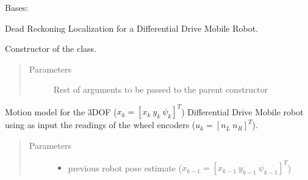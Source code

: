 \documentclass[letterpaper,10pt,english]{sphinxmanual}
\begin{document}
\begin{fulllineitems}
\label{\detokenize{DRLocalization:DR_3DOFDifferentialDrive.DR_3DOFDifferentialDrive}}
\sphinxAtStartPar
Bases: {\hyperref[\detokenize{Localization:Localization.Localization}]{}}

\sphinxAtStartPar
Dead Reckoning Localization for a Differential Drive Mobile Robot.

\begin{fulllineitems}
\label{\detokenize{DRLocalization:DR_3DOFDifferentialDrive.DR_3DOFDifferentialDrive.__init__}}
\sphinxAtStartPar
Constructor of the  class.
\begin{quote}\begin{description}
\item[{Parameters}] \leavevmode
\sphinxAtStartPar
{} \textendash{} Rest of arguments to be passed to the parent constructor

\end{description}\end{quote}

\end{fulllineitems}


\begin{fulllineitems}
\label{\detokenize{DRLocalization:DR_3DOFDifferentialDrive.DR_3DOFDifferentialDrive.Localize}}
\sphinxAtStartPar
Motion model for the 3DOF (\(x_k=[x_{k}~y_{k}~\psi_{k}]^T\)) Differential Drive Mobile robot using as input the readings of the wheel encoders (\(u_k=[n_L~n_R]^T\)).
\begin{quote}\begin{description}
\item[{Parameters}] \leavevmode\begin{itemize}
\item {} 
\sphinxAtStartPar
{} \textendash{} previous robot pose estimate (\(x_{k-1}=[x_{k-1}~y_{k-1}~\psi_{k-1}]^T\))


\end{itemize}
\end{description}
\end{quote}
\end{fulllineitems}
\end{fulllineitems}
\end{document}
